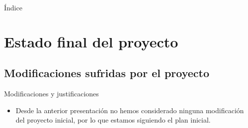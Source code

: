 \documentclass[9pt,xcolor=svgnames]{beamer}
\begin{document}


\begin{frame}
 \titlepage
\end{frame}

\normalsize

\begin{frame}{Índice} 
 \transdissolve
 \tableofcontents
\end{frame}
  
  
 \section{Estado final del proyecto}
 
   
   \subsection{Modificaciones sufridas por el proyecto}
   
   \begin{frame}{Modificaciones y justificaciones}
   \transdissolve
    
    \begin{itemize}
     \item Desde la anterior presentación no hemos considerado
	   ninguna modificación del proyecto inicial, por lo
	   que estamos siguiendo el plan inicial.
	 
    \end{itemize}    
    
   \end{frame}
   
\end{document}
